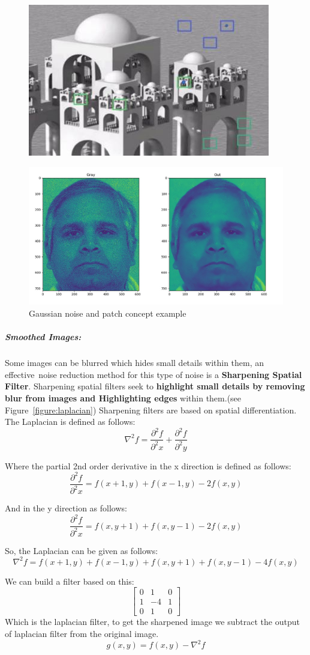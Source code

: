\begin{figure}[H]
	\centering
	\includegraphics[width=.5\linewidth]{images/nlmd.jpg}
\end{figure}

\begin{figure}[H]
	\centering
	\includegraphics[width=.5\linewidth]{images/gaussian.jpg}
	\caption{Gaussian noise and patch concept example}
	\label{fig:Gnoise}
\end{figure}

\subparagraph{Smoothed Images:}
Some images can be blurred which hides small details within them, an effective noise reduction method for this type of noise is a \textbf{Sharpening Spatial Filter}.\newline
Sharpening spatial filters seek to \textbf{highlight small details by removing blur from images and Highlighting edges} within them.(see Figure~\ref{figure:laplacian})\newline
Sharpening filters are based on spatial differentiation.\newline
The Laplacian is defined as follows:
\[\nabla^{2} f = \frac{\partial^{2}f}{\partial^{2}x} + \frac{\partial^{2}f}{\partial^{2}y}\]

Where the partial 2nd order derivative in the x direction is defined as follows:
\[\frac{\partial^{2}f}{\partial^{2}x} = f(x+1, y) + f(x-1, y) - 2f(x, y)\]

And in the y direction as follows:
\[\frac{\partial^{2}f}{\partial^{2}x} = f(x, y+1) + f(x, y-1) - 2f(x, y)\]

So, the Laplacian can be given as follows:
\[\nabla^{2} f = f(x+1, y) + f(x-1, y) + f(x, y+1) + f(x, y-1) - 4f(x, y)\]

We can build a filter based on this:
\[
\begin{bmatrix}
0 & 1 & 0 \\
1 & -4 & 1 \\
0 & 1 & 0
\end{bmatrix} \]
Which is the laplacian filter, to get the sharpened image we subtract the output of laplacian filter from the original image.
\[g(x, y) = f(x, y) - \nabla^{2} f\]


